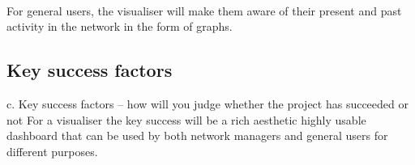 \paragraph{}
For general users, the visualiser will make them aware of their present and past activity in the network in the form of graphs.
\subsection{Key success factors}
c. Key success factors – how will you judge whether the project has succeeded or not
For a visualiser the key success will be a rich aesthetic highly usable dashboard that can be used by both network managers and general users for different purposes.

